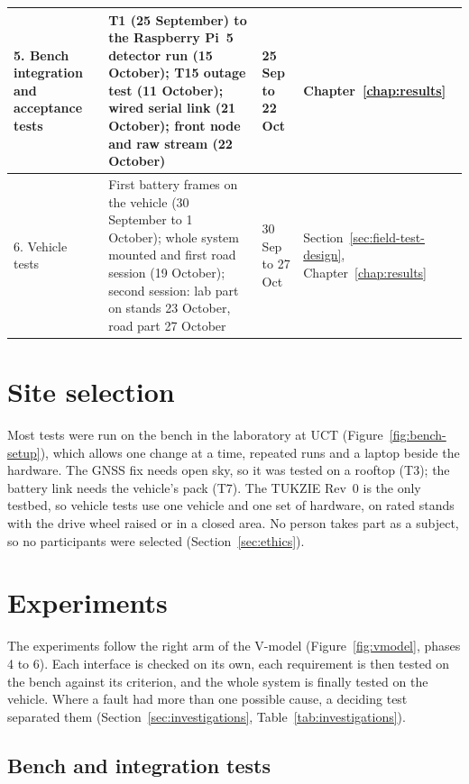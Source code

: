 \begin{table}[htbp]
\begin{tabular}{|p{2.6cm}|p{6.6cm}|p{2.6cm}|p{2.0cm}|}
5. Bench integration and acceptance tests & T1 (25 September) to the Raspberry Pi~5 detector run (15 October); T15 outage test (11 October); wired serial link (21 October); front node and raw stream (22 October) & 25 Sep to 22 Oct & Chapter~\ref{chap:results} \\ \hline
6. Vehicle tests & First battery frames on the vehicle (30 September to 1 October); whole system mounted and first road session (19 October); second session: lab part on stands 23 October, road part 27 October & 30 Sep to 27 Oct & Section~\ref{sec:field-test-design}, Chapter~\ref{chap:results} \\ \hline
\end{tabular}
\end{table}

\section{Site selection}
\label{sec:site-selection}

Most tests were run on the bench in the laboratory at UCT (Figure~\ref{fig:bench-setup}), which allows one change at a time, repeated runs and a laptop beside the hardware. The GNSS fix needs open sky, so it was tested on a rooftop (T3); the battery link needs the vehicle's pack (T7). The TUKZIE Rev~0 is the only testbed, so vehicle tests use one vehicle and one set of hardware, on rated stands with the drive wheel raised or in a closed area. No person takes part as a subject, so no participants were selected (Section~\ref{sec:ethics}).

\section{Experiments}
\label{sec:verification}
\label{sec:experiments}

The experiments follow the right arm of the V-model (Figure~\ref{fig:vmodel}, phases 4 to 6). Each interface is checked on its own, each requirement is then tested on the bench against its criterion, and the whole system is finally tested on the vehicle. Where a fault had more than one possible cause, a deciding test separated them (Section~\ref{sec:investigations}, Table~\ref{tab:investigations}).

\subsection{Bench and integration tests}
\label{sec:bench-tests}


